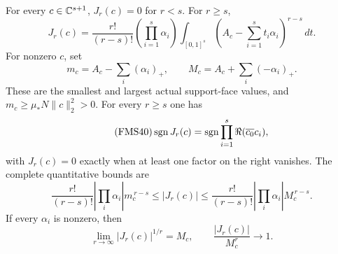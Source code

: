 \begin{theorem}
\label{fms:fms:higher}
For every $c\in\mathbb C^{s+1}$, $J_r(c)=0$ for $r<s$.
For $r\ge s$,
\begin{equation}\tag{FMS38}\label{fms:fms:integral}
 J_r(c)=\frac{r!}{(r-s)!}\left(\prod_{i=1}^s\alpha_i\right)
 \int_{[0,1]^s}
          \left(A_c-\sum_{i=1}^s t_i\alpha_i\right)^{r-s}\,dt.
\end{equation}
For nonzero $c$, set
\begin{equation}\tag{FMS39}\label{fms:fms:minmax}
 m_c=A_c-\sum_i(\alpha_i)_+,\qquad
 M_c=A_c+\sum_i(-\alpha_i)_+.
\end{equation}
These are the smallest and largest actual support-face values,
and $m_c\ge\mu_*N\|c\|_2^2>0$.
For every $r\ge s$ one has
\begin{equation}\tag{FMS40}\label{fms:fms:sign}
 \operatorname{sgn} J_r(c)=
   \operatorname{sgn}\prod_{i=1}^s\Re(\overline{c_0}c_i),
\end{equation}
with $J_r(c)=0$ exactly when at least one factor on the right
vanishes. The complete quantitative bounds are
\begin{equation}\tag{FMS41}\label{fms:fms:bounds}
 \frac{r!}{(r-s)!}\left|\prod_i\alpha_i\right|m_c^{\,r-s}
 \le |J_r(c)|\le
 \frac{r!}{(r-s)!}\left|\prod_i\alpha_i\right|M_c^{\,r-s}.
\end{equation}
If every $\alpha_i$ is nonzero, then
\begin{equation}\tag{FMS42}\label{fms:fms:rate}
 \lim_{r\to\infty}|J_r(c)|^{1/r}=M_c,\qquad
 \frac{|J_r(c)|}{M_c^r}\longrightarrow1.
\end{equation}
\end{theorem}
